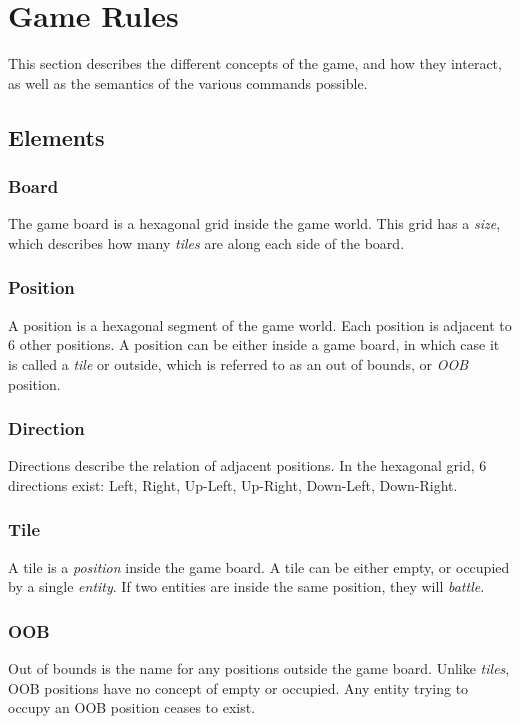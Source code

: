 \section{Game Rules}
\label{sec:game_rules}

This section describes the different concepts of the game, and how they interact, as well as the semantics of the various commands possible.

\subsection{Elements}

\subsubsection{Board}
The game board is a hexagonal grid inside the game world. This grid has a \emph{size}, which describes how many \emph{tiles} are along each side of the board.

\subsubsection{Position}
A position is a hexagonal segment of the game world. Each position is adjacent to 6 other positions. A position can be either inside a game board, in which case it is called a \emph{tile} or outside, which is referred to as an out of bounds, or \emph{OOB} position.

\subsubsection{Direction}
Directions describe the relation of adjacent positions. In the hexagonal grid, 6 directions exist: Left, Right, Up-Left, Up-Right, Down-Left, Down-Right.

\subsubsection{Tile}
A tile is a \emph{position} inside the game board. A tile can be either empty, or occupied by a single \emph{entity}. If two entities are inside the same position, they will \emph{battle}.

\subsubsection{OOB}
Out of bounds is the name for any positions outside the game board. Unlike \emph{tiles}, OOB positions have no concept of empty or occupied. Any entity trying to occupy an OOB position ceases to exist.

